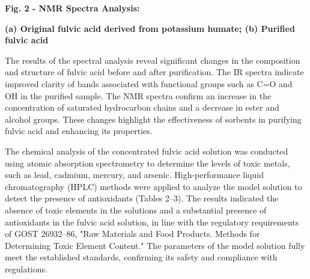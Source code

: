 % 
% 

{\bfseries Fig. 2 - NMR Spectra Analysis:}

{\bfseries (a) Original fulvic acid derived from potassium humate; (b)
Purified fulvic acid}

The results of the spectral analysis reveal significant changes in the
composition and structure of fulvic acid before and after purification.
The IR spectra indicate improved clarity of bands associated with
functional groups such as C=O and OH in the purified sample. The NMR
spectra confirm an increase in the concentration of saturated
hydrocarbon chains and a decrease in ester and alcohol groups. These
changes highlight the effectiveness of sorbents in purifying fulvic acid
and enhancing its properties.

The chemical analysis of the concentrated fulvic acid solution was
conducted using atomic absorption spectrometry to determine the levels
of toxic metals, such as lead, cadmium, mercury, and arsenic.
High-performance liquid chromatography (HPLC) methods were applied to
analyze the model solution to detect the presence of antioxidants
(Tables 2--3). The results indicated the absence of toxic elements in
the solutions and a substantial presence of antioxidants in the fulvic
acid solution, in line with the regulatory requirements of GOST
26932--86, "Raw Materials and Food Products. Methods for Determining
Toxic Element Content." The parameters of the model solution fully meet
the established standards, confirming its safety and compliance with
regulations.

